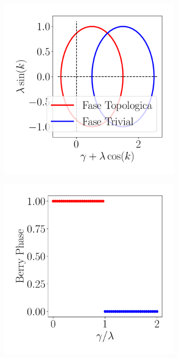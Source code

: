 \begin{figure}[h!]
\begin{subfigure}[b!]{0.27 \textwidth}
     \end{subfigure}\hspace*{-0.9em}
     \begin{subfigure}[b!]{0.27 \textwidth}
         \caption{}
         \includegraphics[width=\textwidth]{Imagenes/Shh_images/loop_shh.pdf}
     \end{subfigure}\hspace*{-0.9em}
     \begin{subfigure}[b!]{0.27 \textwidth}
         \caption{}
         \includegraphics[width=\textwidth]{Imagenes/Shh_images/winding_shh.pdf}

\end{subfigure}
\end{figure}
